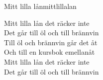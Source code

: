 \begin{song}{Mitt lilla lån}{mittlillalan}
\begin{vers}
\repopen Mitt lilla lån det räcker inte\\
Det går till öl och till brännvin \repclose\\
Till öl och brännvin går det åt\\
Och till en kursbok emellanåt\\
Mitt lilla lån det räcker inte\\
Det går till öl och till brännvin\\
\end{vers}
\end{song}
